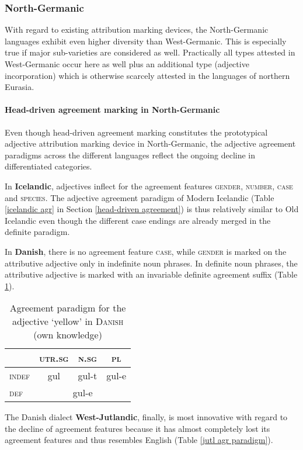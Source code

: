 \subsubsection{North-Germanic} \label{n-germanic synchr}
With regard to existing attribution marking devices, the North-Germanic languages exhibit even higher diversity than West-Germanic. This is especially true if major sub-varieties are considered as well. Practically all types attested in West-Germanic occur here as well plus an additional type (adjective incorporation) which is otherwise scarcely attested in the languages of northern Eurasia.

\paragraph{Head-driven agreement marking in North-Germanic} Even though head-driven agreement marking constitutes the prototypical adjective attribution marking device in North-Germanic, the adjective agreement paradigms across the different languages reflect the ongoing decline in differentiated categories.

In {\bf Icelandic}, adjectives inflect for the agreement features \textsc{gender}, \textsc{number}, \textsc{case} and \textsc{species}. The adjective agreement paradigm of Modern Icelandic (Table \ref{icelandic agr} in Section \ref{head-driven agreement}) is thus relatively similar to Old Icelandic even though the different case endings are already merged in the definite paradigm.

In {\bf Danish},\label{danish synchr} there is no agreement feature \textsc{case}, while \textsc{gender} is marked on the attributive adjective only in indefinite noun phrases. In definite noun phrases, the attributive adjective is marked with an invariable definite agreement suffix (Table \ref{danish agr paradigm}). 

\begin{table}
\begin{center}
\begin{footnotesize}
\begin{tabular}[h]{l|c c c}
\hline
\hline
		& \textsc{utr.sg}	&\textsc{n.sg}	&\textsc{pl}\\
\hline
\textsc{indef}	&gul	 	&gul-t		&gul-e\\
\hline
\textsc{def}	&\multicolumn{3}{c}{gul-e}\\
\hline
\hline
\end{tabular}
\caption[Adjective paradigm for \textsc{Danish}]{Agreement paradigm for the adjective ‘yellow’ in \textsc{Danish} (own knowledge)}\label{danish agr paradigm}
\end{footnotesize}
\end{center}
\end{table}
The Danish dialect {\bf West-Jutlandic}, finally, is most innovative with regard to the decline of agreement features because it has almost completely lost its agreement features and thus resembles English (Table \ref{jutl agr paradigm}).

